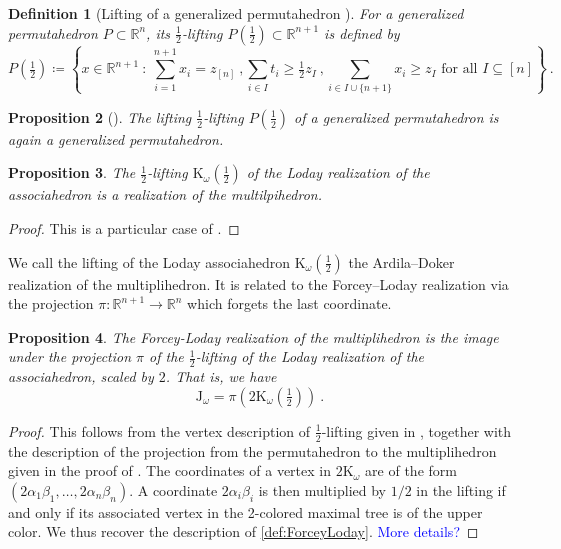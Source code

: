 \documentclass[twoside, 12pt]{amsart}
\newtheorem{definition}{Definition}[section]
\newtheorem{proposition}[definition]{Proposition}
\theoremstyle{remark}
\newcommand{\RR}{\mathbb{R}}
\newcommand{\K}{\mathrm{K}}
\newcommand{\J}{\mathrm{J}}
\newcommand{\Guillaume}[1]{\textcolor{blue}{#1}}
\begin{document}
\begin{definition}[Lifting of a generalized permutahedron {\cite[Definition 2.3]{AD13}}]
For a generalized permutahedron $P\subset \RR^n$, its \emph{$\tfrac{1}{2}$-lifting} $P \left(\tfrac{1}{2}\right) \subset \RR^{n+1}$ is defined by 
\[P \left(\tfrac{1}{2}\right) \coloneqq \left\{ x \in \RR^{n+1} \ : \ 
\sum_{i=1}^{n+1} x_i = z_{[n]} \ , 
\sum_{i \in I} t_i \geq \tfrac{1}{2}z_I \ ,
\sum_{i \in I \cup \{n+1\}} x_i \geq z_I 
\text{ for all } I \subseteq [n] \right\} \ . \]
\end{definition}

\begin{proposition}[{\cite[Proposition 2.4]{AD13}}] The lifting $\tfrac{1}{2}$-lifting $P \left(\tfrac{1}{2}\right)$ of a generalized permutahedron is again a generalized permutahedron. 
\end{proposition}

\begin{proposition} The $\tfrac{1}{2}$-lifting $\K_\omega\left(\tfrac{1}{2}\right)$ of the Loday realization of the associahedron is a realization of the multilpihedron. 
\end{proposition}
\begin{proof} 
This is a particular case of \cite[Corollary 4.10]{AD13}.
\end{proof}

We call the lifting of the Loday associahedron $\K_\omega\left(\tfrac{1}{2}\right)$ the Ardila--Doker realization of the multiplihedron. It is related to the Forcey--Loday realization via the projection $\pi: \RR^{n+1} \to \RR^n$ which forgets the last coordinate. 
 
\begin{proposition} 
\label{prop:lifting} 
The Forcey-Loday realization of the multiplihedron is the image under the projection $\pi$ of the $\tfrac{1}{2}$-lifting of the Loday realization of the associahedron, scaled by $2$. 
That is, we have  \[ \J_\omega = \pi \left(2 \K_\omega\left(\tfrac{1}{2}\right)\right) \ . \]
\end{proposition}

\begin{proof} 
  This follows from the vertex description of $\tfrac{1}{2}$-lifting given in \cite[Definition 3.5.3]{Doker11}, together with the description of the projection from the permutahedron to the multiplihedron given in the proof of \cite[Theorem 3.3.6]{Doker11}. 
  The coordinates of a vertex in $2 \K_\omega$ are of the form $(2\alpha_1\beta_1, \ldots, 2\alpha_n\beta_n)$. 
  A coordinate $2\alpha_i\beta_i$ is then multiplied by $1/2$ in the lifting if and only if its associated vertex in the 2-colored maximal tree is of the upper color. 
  We thus recover the description of \cref{def:ForceyLoday}. \Guillaume{More details?}
\end{proof}
\end{document}
